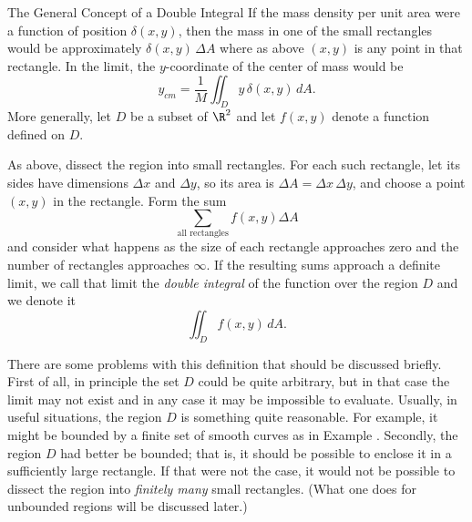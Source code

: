 \subhead The General Concept of a Double Integral \endsubhead
If the mass density per unit area were a function of position
$\delta(x,y)$, then the mass in one of the small rectangles
would be approximately  $\delta(x,y)\,\Delta A$ where as above
$(x,y)$ is any point in that rectangle.   In the limit,
 the $y$-coordinate of the center of mass
would be 
$$
   y_{cm} =\frac 1M \iint_D y\,\delta(x,y)\, dA.
$$
More generally, let $D$ be a subset of $\R^2$ and let $f(x,y)$
denote a function defined on $D$.
\medskip
\centerline{}
\medskip
  As above, dissect the region
into small rectangles.  For each such rectangle, let its
sides have dimensions $\Delta x$ and $\Delta y$, so its area
is $\Delta A = \Delta x\,\Delta y$, and choose a point
$(x,y)$ in the rectangle.  Form the sum
$$
     \sum_{\text{all rectangles}}f(x,y)\Delta A
$$
and consider what happens as the size of each rectangle approaches
zero and the number of rectangles approaches $\infty$.   If the
 resulting sums approach a definite limit, we call that
limit the {\it double integral\/} of the function over the region $D$
%
%
and we denote it
$$
     \iint_D f(x,y)\, dA.
$$
\medskip
\centerline{}
\medskip
There are some problems with this definition that should be
discussed briefly.   First of all, in principle the set $D$
could be quite arbitrary, but in that case the limit may
not exist and in any case it may be impossible to evaluate.
Usually, in useful situations, the region $D$ is something
quite reasonable.  For example, it might be bounded by a finite
set of smooth curves as in Example \ExTwo.  Secondly, the region
$D$ had better be bounded; that is, it should be
possible to enclose it in a sufficiently large rectangle.
If that were not the case, it would not be possible to dissect
the region into {\it finitely many\/} small rectangles.
(What one does for unbounded regions will be discussed later.)

